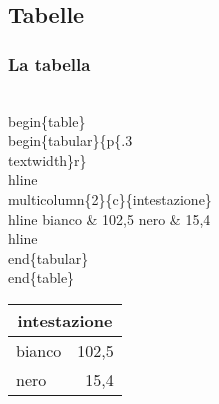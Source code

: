 \documentclass[svgnames,%
	ucs,%
	pdftex]{guitbeamer}
\begin{document}
\subsection{Tabelle}
\begin{frame}
  \frametitle{La tabella}
	\begin{LaTeXcode}
		\alert{\\begin\{table\}}\n
		\\begin\{tabular\}\{p\{.3\\textwidth\}r\}\
		\\hline \n
		\\multicolumn\{2\}\{c\}\{intestazione\}\bs\bs \
		\\hline \n
		\hspace*{5ex}bianco \& 102,5 \bs\bs\n
		\hspace*{5ex}nero   \& 15,4 \bs\bs\
		\\hline\n
		\\end\{tabular\}\n
		\alert{\\end\{table\}}
	\end{LaTeXcode}
	\begin{LaTeXoutput}\centering
		\begin{tabular}{p{}r}\hline
		\multicolumn{2}{c}{intestazione}\\\hline
		bianco & 102,5 \\
		nero   & 15,4 \\\hline
		\end{tabular}
	\end{LaTeXoutput}
\end{frame}
\end{document}
